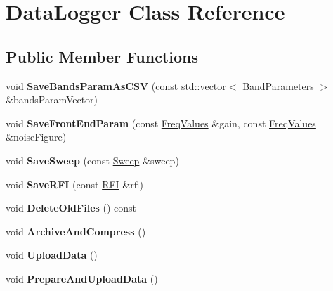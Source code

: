 \hypertarget{classDataLogger}{}\section{Data\+Logger Class Reference}
\label{classDataLogger}
\subsection*{Public Member Functions}
\begin{DoxyCompactItemize}
\item 
\mbox{\label{classDataLogger_a2ffe9fb45883c2880e1c45a4406fc22b}} 
void {\bfseries Save\+Bands\+Param\+As\+C\+SV} (const std\+::vector$<$ \hyperlink{structBandParameters}{Band\+Parameters} $>$ \&bands\+Param\+Vector)
\item 
\mbox{\label{classDataLogger_a058ed66d04269e7d37501ecfe775c067}} 
void {\bfseries Save\+Front\+End\+Param} (const \hyperlink{structFreqValues}{Freq\+Values} \&gain, const \hyperlink{structFreqValues}{Freq\+Values} \&noise\+Figure)
\item 
\mbox{\label{classDataLogger_ab2063fcd87971520a5bfa5aef6d73fea}} 
void {\bfseries Save\+Sweep} (const \hyperlink{structSweep}{Sweep} \&sweep)
\item 
\mbox{\label{classDataLogger_a0c772c3529adc3759ba0e1e596500f65}} 
void {\bfseries Save\+R\+FI} (const \hyperlink{structRFI}{R\+FI} \&rfi)
\item 
\mbox{\label{classDataLogger_a4fd6e432dd4348cbe3b02a0fd6969ab5}} 
void {\bfseries Delete\+Old\+Files} () const
\item 
\mbox{\label{classDataLogger_a147fb7eaee1c38bbf57ef2d6cddf70d5}} 
void {\bfseries Archive\+And\+Compress} ()
\item 
\mbox{\label{classDataLogger_ab58f4cc05f738ef757c884fe9ef131eb}} 
void {\bfseries Upload\+Data} ()
\item 
\mbox{\label{classDataLogger_a98ea7aaa941bbddea8069415e1652759}} 
void {\bfseries Prepare\+And\+Upload\+Data} ()
\end{DoxyCompactItemize}
